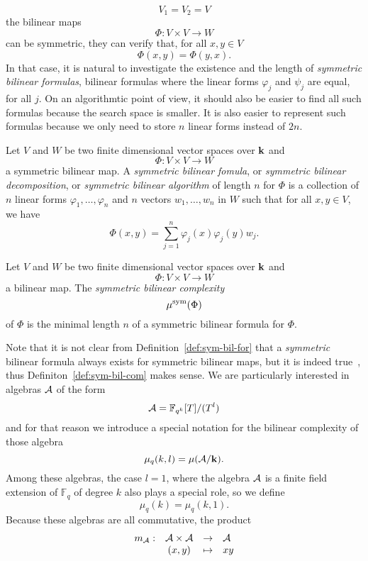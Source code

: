 \[
  V_1 = V_2 = V
\]
the bilinear maps 
\[
  \Phi:V\times V\to W
\]
can be symmetric, \ie they can verify that, for all $x, y\in V$
\[
  \Phi(x, y) = \Phi(y, x).
\]
In that case, it is natural to investigate the existence and the length of
\emph{symmetric bilinear formulas}, \ie bilinear formulas where the linear forms
$\varphi_j$ and $\psi_j$ are equal, for all $j$. On an algorithmtic point of
view, it should also be easier to find all such formulas because the
search space is smaller. It is also easier to represent such formulas because we
only need to store $n$ linear forms instead of $2n$.
\begin{defi}
  \label{def:sym-bil-for}
  Let $V$ and $W$ be two finite dimensional vector spaces over $\mathbf{k}$ and 
  \[
    \Phi:V\times V\to W
  \]
  a symmetric bilinear map. A \emph{symmetric bilinear fomula}, or
  \emph{symmetric bilinear decomposition}, or
  \emph{symmetric bilinear algorithm} of length $n$ for $\Phi$ is a
  collection of $n$ linear forms $\varphi_1, \dots, \varphi_n$
  and $n$ vectors $w_1, \dots, w_n$ in $W$ such that for all
  $x, y\in V$, we have
  \[
    \Phi(x, y) = \sum_{j=1}^n \varphi_j(x)\varphi_j(y)w_j.
  \]
\end{defi}
\begin{defi}
  \label{def:sym-bil-com}
  Let $V$ and $W$ be two finite dimensional vector spaces over $\mathbf{k}$ and 
  \[
    \Phi:V\times V\to W
  \]
  a bilinear map. The \emph{symmetric bilinear complexity} 
  \[
    \mu^{\textrm{sym}}(\Phi)
  \]
  of $\Phi$ is the minimal length $n$ of a symmetric bilinear formula for
  $\Phi$.
\end{defi}
Note that it is not clear from Definition~\ref{def:sym-bil-for} that a
\emph{symmetric} bilinear formula always
exists for symmetric bilinear maps, but it is indeed
true~\cite[Lemma $1.6$]{Randriam12}, thus
Definiton~\ref{def:sym-bil-com} makes sense. We are particularly
interested in algebras $\mathcal{A}$ of the form
\[
  \mathcal{A} = \mathbb{F}_{q^k}[T]/(T^l)
\]
and for that reason we introduce a special notation for the bilinear complexity
of those algebra
\[
  \mu_q(k, l) = \mu(\mathcal{A}/\mathbf{k}).
\]
Among these algebras, the case $l=1$, where the algebra $\mathcal{A}$ is a finite field
extension of $\mathbb{F}_q$ of degree $k$ also plays a special role, so we
define 
\[
  \mu_q(k) = \mu_q(k, 1).
\]
Because these algebras are all commutative, the product 
\[
\begin{array}{lccl}
  m_{\mathcal{A}}:&\mathcal{A}\times \mathcal{A}&\to&\mathcal{A}\\
  &(x, y)&\mapsto&xy
\end{array}
\]
